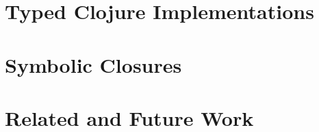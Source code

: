 \documentclass[11pt]{iuthesis}
\begin{document}
%
%
%
%

\part{Typed Clojure Implementations}
\label{part:implementations}


\part{%
Symbolic Closures}
\label{part:symbolic-closures}



\part{Related and Future Work}
\label{part:related-future-work}





\end{document}
